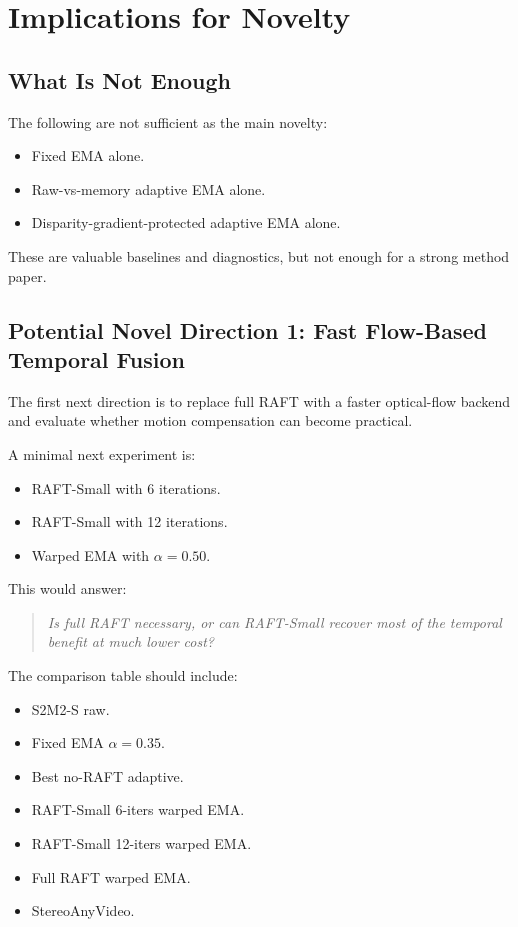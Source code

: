 \documentclass[11pt,a4paper]{article}
\begin{document}
\section{Implications for Novelty}

\subsection{What Is Not Enough}

The following are not sufficient as the main novelty:

\begin{itemize}[leftmargin=*]
    \item Fixed EMA alone.
    \item Raw-vs-memory adaptive EMA alone.
    \item Disparity-gradient-protected adaptive EMA alone.
\end{itemize}

These are valuable baselines and diagnostics, but not enough for a strong method paper.

\subsection{Potential Novel Direction 1: Fast Flow-Based Temporal Fusion}

The first next direction is to replace full RAFT with a faster optical-flow backend and evaluate whether motion compensation can become practical.

A minimal next experiment is:

\begin{itemize}[leftmargin=*]
    \item RAFT-Small with 6 iterations.
    \item RAFT-Small with 12 iterations.
    \item Warped EMA with $\alpha=0.50$.
\end{itemize}

This would answer:

\begin{quote}
\emph{Is full RAFT necessary, or can RAFT-Small recover most of the temporal benefit at much lower cost?}
\end{quote}

The comparison table should include:

\begin{itemize}[leftmargin=*]
    \item S2M2-S raw.
    \item Fixed EMA $\alpha=0.35$.
    \item Best no-RAFT adaptive.
    \item RAFT-Small 6-iters warped EMA.
    \item RAFT-Small 12-iters warped EMA.
    \item Full RAFT warped EMA.
    \item StereoAnyVideo.
\end{itemize}
\end{document}
